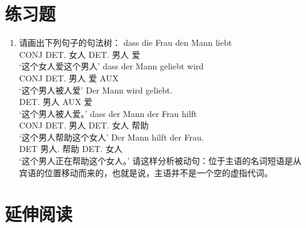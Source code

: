 \section*{练习题}

\begin{enumerate}
\item 请画出下列句子的句法树：
\eal
\ex 
\gll dass die Frau den Mann liebt\\
     CONJ DET.\nom{} 女人 DET.\acc{} 男人 爱\\
\glt `这个女人爱这个男人'
\ex 
\gll dass der Mann geliebt wird\\
     CONJ DET.\nom{} 男人 爱 AUX\\
\glt `这个男人被人爱'
\ex 
\gll Der Mann wird geliebt.\\
     DET.\nom{} 男人 AUX 爱\\
\glt `这个男人被人爱。'
\ex 
\gll dass der Mann der Frau hilft\\
     CONJ DET.\nom{} 男人 DET.\dat{} 女人 帮助\\
\glt `这个男人帮助这个女人'
\ex 
\gll Der Mann hilft der Frau.\\
     DET 男人.\nom{} 帮助 DET.\dat{} 女人\\
\glt `这个男人正在帮助这个女人。'
\zl
请这样分析被动句：位于主语的名词短语是从宾语的位置移动而来的，也就是说，主语并不是一个空的虚指代词。
\end{enumerate}



\section*{延伸阅读}

